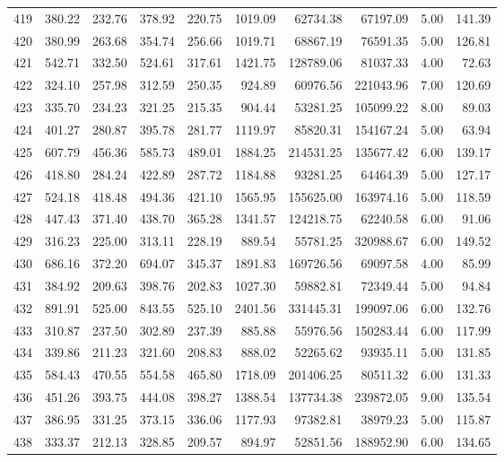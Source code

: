 \begin{tabular}{lrrrrrrrrr}
419 & 380.22 & 232.76 & 378.92 & 220.75 & 1019.09 & 62734.38 & 67197.09 & 5.00 & 141.39 \\
420 & 380.99 & 263.68 & 354.74 & 256.66 & 1019.71 & 68867.19 & 76591.35 & 5.00 & 126.81 \\
421 & 542.71 & 332.50 & 524.61 & 317.61 & 1421.75 & 128789.06 & 81037.33 & 4.00 & 72.63 \\
422 & 324.10 & 257.98 & 312.59 & 250.35 & 924.89 & 60976.56 & 221043.96 & 7.00 & 120.69 \\
423 & 335.70 & 234.23 & 321.25 & 215.35 & 904.44 & 53281.25 & 105099.22 & 8.00 & 89.03 \\
424 & 401.27 & 280.87 & 395.78 & 281.77 & 1119.97 & 85820.31 & 154167.24 & 5.00 & 63.94 \\
425 & 607.79 & 456.36 & 585.73 & 489.01 & 1884.25 & 214531.25 & 135677.42 & 6.00 & 139.17 \\
426 & 418.80 & 284.24 & 422.89 & 287.72 & 1184.88 & 93281.25 & 64464.39 & 5.00 & 127.17 \\
427 & 524.18 & 418.48 & 494.36 & 421.10 & 1565.95 & 155625.00 & 163974.16 & 5.00 & 118.59 \\
428 & 447.43 & 371.40 & 438.70 & 365.28 & 1341.57 & 124218.75 & 62240.58 & 6.00 & 91.06 \\
429 & 316.23 & 225.00 & 313.11 & 228.19 & 889.54 & 55781.25 & 320988.67 & 6.00 & 149.52 \\
430 & 686.16 & 372.20 & 694.07 & 345.37 & 1891.83 & 169726.56 & 69097.58 & 4.00 & 85.99 \\
431 & 384.92 & 209.63 & 398.76 & 202.83 & 1027.30 & 59882.81 & 72349.44 & 5.00 & 94.84 \\
432 & 891.91 & 525.00 & 843.55 & 525.10 & 2401.56 & 331445.31 & 199097.06 & 6.00 & 132.76 \\
433 & 310.87 & 237.50 & 302.89 & 237.39 & 885.88 & 55976.56 & 150283.44 & 6.00 & 117.99 \\
434 & 339.86 & 211.23 & 321.60 & 208.83 & 888.02 & 52265.62 & 93935.11 & 5.00 & 131.85 \\
435 & 584.43 & 470.55 & 554.58 & 465.80 & 1718.09 & 201406.25 & 80511.32 & 6.00 & 131.33 \\
436 & 451.26 & 393.75 & 444.08 & 398.27 & 1388.54 & 137734.38 & 239872.05 & 9.00 & 135.54 \\
437 & 386.95 & 331.25 & 373.15 & 336.06 & 1177.93 & 97382.81 & 38979.23 & 5.00 & 115.87 \\
438 & 333.37 & 212.13 & 328.85 & 209.57 & 894.97 & 52851.56 & 188952.90 & 6.00 & 134.65 \\

\end{tabular}
